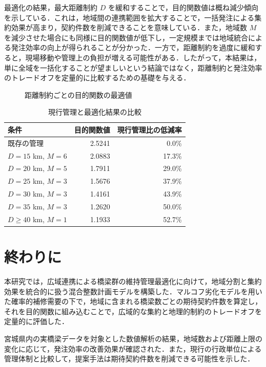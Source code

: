 \documentclass[Journal,letterpaper,InsideFigs,NoLineNumbers]{ascelike-new}
\begin{document}
最適化の結果，最大距離制約 \(D\) を緩和することで，目的関数値は概ね減少傾向を示している．これは，地域間の連携範囲を拡大することで，一括発注による集約効果が高まり，契約件数を削減できることを意味している．また，地域数 \(M\) を減少させた場合にも同様に目的関数値が低下し，一定規模までは地域統合による発注効率の向上が得られることが分かった．一方で，距離制約を過度に緩和すると，現場移動や管理上の負担が増える可能性がある．したがって，本結果は，単に全域を一括化することが望ましいという結論ではなく，距離制約と発注効率のトレードオフを定量的に比較するための基礎を与える．

\begin{figure}[h]
\centering
{}
\caption{距離制約ごとの目的関数の最適値}
\label{fig:optimization_results}
\end{figure}

\begin{table}[h]
\centering
\caption{現行管理と最適化結果の比較}
\label{tab:optimization_results}
\begin{tabular}{lrr}
\toprule
条件 & 目的関数値 & 現行管理比の低減率 \\
\midrule
既存の管理 & 2.5241 & 0.0\% \\
\(D=15\) km, \(M=6\) & 2.0883 & 17.3\% \\
\(D=20\) km, \(M=5\) & 1.7911 & 29.0\% \\
\(D=25\) km, \(M=3\) & 1.5676 & 37.9\% \\
\(D=30\) km, \(M=3\) & 1.4161 & 43.9\% \\
\(D=35\) km, \(M=3\) & 1.2620 & 50.0\% \\
\(D \geq 40\) km, \(M=1\) & 1.1933 & 52.7\% \\
\bottomrule
\end{tabular}
\end{table}

\section{終わりに}

本研究では，広域連携による橋梁群の維持管理最適化に向けて，地域分割と集約効果を統合的に扱う混合整数計画モデルを構築した．マルコフ劣化モデルを用いた確率的補修需要の下で，地域に含まれる橋梁数ごとの期待契約件数を算定し，それを目的関数に組み込むことで，広域的な集約と地理的制約のトレードオフを定量的に評価した．

宮城県内の実橋梁データを対象とした数値解析の結果，地域数および距離上限の変化に応じて，発注効率の改善効果が確認された．また，現行の行政単位による管理体制と比較して，提案手法は期待契約件数を削減できる可能性を示した．
\end{document}
